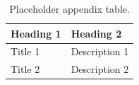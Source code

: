 
\label{appendix:example-table}

\begin{table}[H]
  \centering
  \begin{tabular}{@{}lp{9cm}@{}}
    \toprule
    \textbf{Heading 1} & \textbf{Heading 2} \\
    \midrule
    Title 1 & Description 1 \\
    Title 2 & Description 2 \\
    \bottomrule
  \end{tabular}
  \caption{Placeholder appendix table.}
\end{table}
